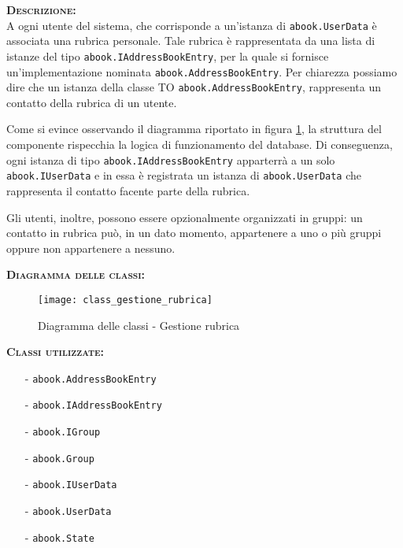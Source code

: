 \begin{description}
	\item{\scshape\bfseries Descrizione:}\\
A ogni utente del sistema, che corrisponde a un'istanza di \texttt{abook.UserData} è associata una rubrica personale. Tale rubrica è rappresentata da una lista di istanze del tipo \texttt{abook.IAddressBookEntry}, per la quale si fornisce un'implementazione nominata \texttt{abook.AddressBookEntry}. Per chiarezza possiamo dire che un istanza della classe TO \texttt{abook.AddressBookEntry}, rappresenta un contatto della rubrica di un utente.

Come si evince osservando il diagramma riportato in figura \ref{fig:gestionerubrica}, la struttura del componente rispecchia la logica di funzionamento del database. Di conseguenza, ogni istanza di tipo \texttt{abook.IAddressBookEntry} apparterrà a un solo \texttt{abook.IUserData} e in essa è registrata un istanza di \texttt{abook.UserData} che rappresenta il contatto facente parte della rubrica.

Gli utenti, inoltre, possono essere opzionalmente organizzati in gruppi: un contatto in rubrica può, in un dato momento, appartenere a uno o più gruppi oppure non appartenere a nessuno.

	\item{\scshape\bfseries Diagramma delle classi:}
\begin{figure}[H]
  \centering
  \texttt{[image: class\_gestione\_rubrica]}
  \caption{Diagramma delle classi - Gestione rubrica}\label{fig:gestionerubrica}
\end{figure}
	
	\item{\scshape\bfseries Classi utilizzate:}\\
	\begin{itemize}[nolistsep, noitemsep]
	  \item[-] \texttt{abook.AddressBookEntry}
	  \item[-] \texttt{abook.IAddressBookEntry}
	  \item[-] \texttt{abook.IGroup}
	  \item[-] \texttt{abook.Group}
	  \item[-] \texttt{abook.IUserData}
	  \item[-] \texttt{abook.UserData}
	  \item[-] \texttt{abook.State}
	\end{itemize}
\end{description}

